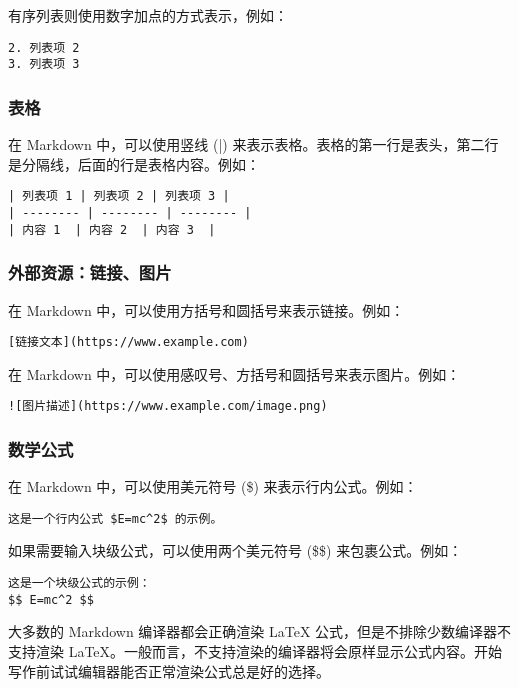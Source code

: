\documentclass[../main.tex]{subfiles}
\begin{document}
有序列表则使用数字加点的方式表示，例如：

\begin{lstlisting}
2. 列表项 2
3. 列表项 3
\end{lstlisting}

\subsubsection{表格}

在 Markdown 中，可以使用竖线 (|) 来表示表格。表格的第一行是表头，第二行是分隔线，后面的行是表格内容。例如：

\begin{lstlisting}
| 列表项 1 | 列表项 2 | 列表项 3 |
| -------- | -------- | -------- |
| 内容 1  | 内容 2  | 内容 3  |
\end{lstlisting}

\subsubsection{外部资源：链接、图片}

在 Markdown 中，可以使用方括号和圆括号来表示链接。例如：

\begin{lstlisting}
[链接文本](https://www.example.com)
\end{lstlisting}

在 Markdown 中，可以使用感叹号、方括号和圆括号来表示图片。例如：

\begin{lstlisting}
![图片描述](https://www.example.com/image.png)
\end{lstlisting}

\subsubsection{数学公式}

在 Markdown 中，可以使用美元符号 (\$) 来表示行内公式。例如：

\begin{lstlisting}
这是一个行内公式 $E=mc^2$ 的示例。
\end{lstlisting}

如果需要输入块级公式，可以使用两个美元符号 (\$\$) 来包裹公式。例如：

\begin{lstlisting}
这是一个块级公式的示例：
$$ E=mc^2 $$
\end{lstlisting}

大多数的 Markdown 编译器都会正确渲染 LaTeX 公式，但是不排除少数编译器不支持渲染 LaTeX。一般而言，不支持渲染的编译器将会原样显示公式内容。开始写作前试试编辑器能否正常渲染公式总是好的选择。
\end{document}
